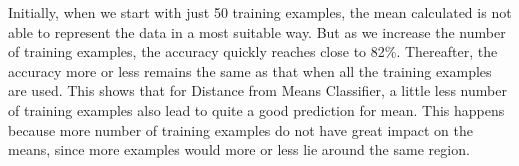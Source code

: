 \documentclass{article}
\begin{document}
Initially, when we start with just 50 training examples, the mean calculated is not able to represent the data in a most suitable way. But as we increase the number of training examples, the accuracy quickly reaches close to 82\%. Thereafter, the accuracy more or less remains the same as that when all the training examples are used. This shows that for Distance from Means Classifier, a little less number of training examples also lead to quite a good prediction for mean. This happens because more number of training examples do not have great impact on the means, since more examples would more or less lie around the same region. 
\end{document}
